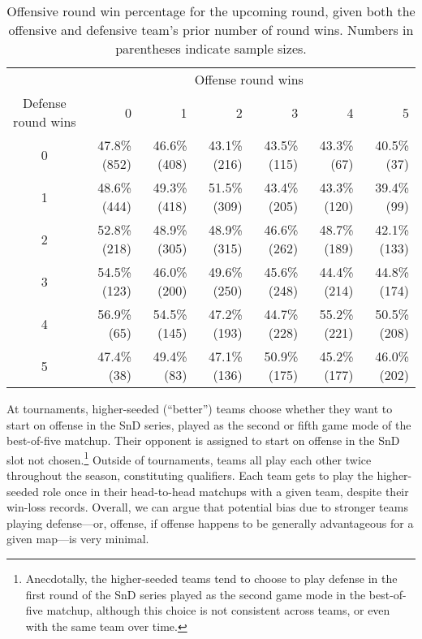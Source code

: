 \documentclass{article}
\begin{document}
\begin{table}

\caption{Offensive round win percentage for the upcoming round, given both the offensive and defensive team's prior number of round wins. Numbers in parentheses indicate sample sizes.}

\centering
\begin{tabular}{crrrrrr}
\toprule
& \multicolumn{6}{c}{Offense round wins} \\ 
\cmidrule(lr){2-7}
Defense round wins & 0 & 1 & 2 & 3 & 4 & 5 \\ 
\midrule

0 & 47.8\%(852) & 46.6\%(408) & 43.1\%(216) & 43.5\%(115) & 43.3\%(67)  & 40.5\%(37)  \\
1 & 48.6\%(444) & 49.3\%(418) & 51.5\%(309) & 43.4\%(205) & 43.3\%(120) & 39.4\%(99)  \\
2 & 52.8\%(218) & 48.9\%(305) & 48.9\%(315) & 46.6\%(262) & 48.7\%(189) & 42.1\%(133) \\
3 & 54.5\%(123) & 46.0\%(200) & 49.6\%(250) & 45.6\%(248) & 44.4\%(214) & 44.8\%(174) \\
4 & 56.9\%(65)  & 54.5\%(145) & 47.2\%(193) & 44.7\%(228) & 55.2\%(221) & 50.5\%(208) \\
5 & 47.4\%(38)  & 49.4\%(83)  & 47.1\%(136) & 50.9\%(175) & 45.2\%(177) & 46.0\%(202) \\

\bottomrule
\end{tabular}

\label{tbl:o-win-prop-by-series-state}

\end{table}

At tournaments, higher-seeded (``better'') teams choose whether they
want to start on offense in the SnD series, played as the second or
fifth game mode of the best-of-five matchup. Their opponent is assigned
to start on offense in the SnD slot not chosen.\footnote{Anecdotally,
  the higher-seeded teams tend to choose to play defense in the first
  round of the SnD series played as the second game mode in the
  best-of-five matchup, although this choice is not consistent across
  teams, or even with the same team over time.} Outside of tournaments,
teams all play each other twice throughout the season, constituting
qualifiers. Each team gets to play the higher-seeded role once in their
head-to-head matchups with a given team, despite their win-loss records.
Overall, we can argue that potential bias due to stronger teams playing
defense---or, offense, if offense happens to be generally advantageous
for a given map---is very minimal.
\end{document}
